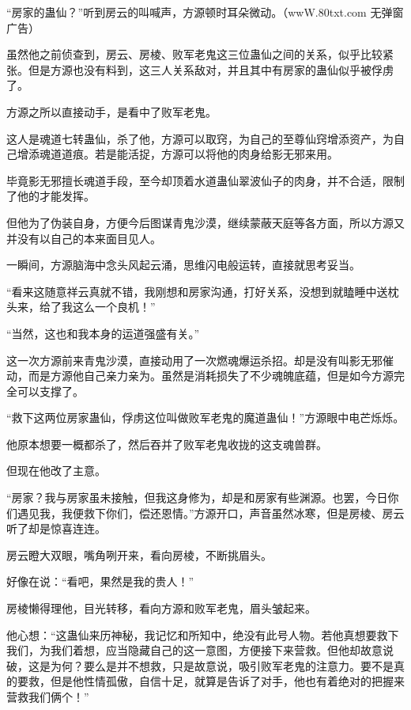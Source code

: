 
\begin{this_body}

“房家的蛊仙？”听到房云的叫喊声，方源顿时耳朵微动。（wwW.80txt.com 无弹窗广告）

虽然他之前侦查到，房云、房棱、败军老鬼这三位蛊仙之间的关系，似乎比较紧张。但是方源也没有料到，这三人关系敌对，并且其中有房家的蛊仙似乎被俘虏了。

方源之所以直接动手，是看中了败军老鬼。

这人是魂道七转蛊仙，杀了他，方源可以取窍，为自己的至尊仙窍增添资产，为自己增添魂道道痕。若是能活捉，方源可以将他的肉身给影无邪来用。

毕竟影无邪擅长魂道手段，至今却顶着水道蛊仙翠波仙子的肉身，并不合适，限制了他的才能发挥。

但他为了伪装自身，方便今后图谋青鬼沙漠，继续蒙蔽天庭等各方面，所以方源又并没有以自己的本来面目见人。

一瞬间，方源脑海中念头风起云涌，思维闪电般运转，直接就思考妥当。

“看来这随意祥云真就不错，我刚想和房家沟通，打好关系，没想到就瞌睡中送枕头来，给了我这么一个良机！”

“当然，这也和我本身的运道强盛有关。”

这一次方源前来青鬼沙漠，直接动用了一次燃魂爆运杀招。却是没有叫影无邪催动，而是方源他自己亲力亲为。虽然是消耗损失了不少魂魄底蕴，但是如今方源完全可以支撑了。

“救下这两位房家蛊仙，俘虏这位叫做败军老鬼的魔道蛊仙！”方源眼中电芒烁烁。

他原本想要一概都杀了，然后吞并了败军老鬼收拢的这支魂兽群。

但现在他改了主意。

“房家？我与房家虽未接触，但我这身修为，却是和房家有些渊源。也罢，今日你们遇见我，我便救下你们，偿还恩情。”方源开口，声音虽然冰寒，但是房棱、房云听了却是惊喜连连。

房云瞪大双眼，嘴角咧开来，看向房棱，不断挑眉头。

好像在说：“看吧，果然是我的贵人！”

房棱懒得理他，目光转移，看向方源和败军老鬼，眉头皱起来。

他心想：“这蛊仙来历神秘，我记忆和所知中，绝没有此号人物。若他真想要救下我们，为我们着想，应当隐藏自己的这一意图，方便接下来营救。但他却故意说破，这是为何？要么是并不想救，只是故意说，吸引败军老鬼的注意力。要不是真的要救，但是他性情孤傲，自信十足，就算是告诉了对手，他也有着绝对的把握来营救我们俩个！”


\end{this_body}
